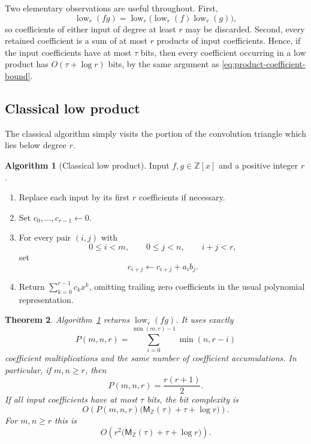 \documentclass[11pt]{book}
\newtheorem{theorem}{Theorem}[section]
\theoremstyle{definition}
\newtheorem{algorithm}[theorem]{Algorithm}
\newcommand{\ZZ}{\mathbb Z}
\newcommand{\MZ}{\mathsf M_{\ZZ}}
\begin{document}
Two elementary observations are useful throughout.  First,
\begin{equation}\label{eq:low-truncate-inputs}
 \operatorname{low}_r(fg)
 =\operatorname{low}_r\bigl(\operatorname{low}_r(f)
                            \operatorname{low}_r(g)\bigr),
\end{equation}
so coefficients of either input of degree at least $r$ may be discarded.
Second, every retained coefficient is a sum of at most $r$ products of input
coefficients.  Hence, if the input coefficients have at most $\tau$ bits,
then every coefficient occurring in a low product has
$O(\tau+\log r)$ bits, by the same argument as
\eqref{eq:product-coefficient-bound}.

\subsection{Classical low product}

The classical algorithm simply visits the portion of the convolution triangle
which lies below degree $r$.

\begin{algorithm}[Classical low product]\label{alg:classical-low-product}
Input $f,g\in\ZZ[x]$ and a positive integer $r$.
\begin{enumerate}
 \item Replace each input by its first $r$ coefficients if necessary.
 \item Set $c_0,\ldots,c_{r-1}\leftarrow0$.
 \item For every pair $(i,j)$ with
 \[
    0\leq i<m,\qquad 0\leq j<n,\qquad i+j<r,
 \]
 set
 \[
    c_{i+j}\leftarrow c_{i+j}+a_ib_j.
 \]
 \item Return $\sum_{k=0}^{r-1}c_kx^k$, omitting trailing zero
 coefficients in the usual polynomial representation.
\end{enumerate}
\end{algorithm}

\begin{theorem}\label{thm:classical-low-product}
Algorithm~\ref{alg:classical-low-product} returns
$\operatorname{low}_r(fg)$.  It uses exactly
\begin{equation}\label{eq:classical-low-count}
 P(m,n,r)=
 \sum_{i=0}^{\min(m,r)-1}\min(n,r-i)
\end{equation}
coefficient multiplications and the same number of coefficient
accumulations.  In particular, if $m,n\geq r$, then
\[
 P(m,n,r)=\frac{r(r+1)}2.
\]
If all input coefficients have at most $\tau$ bits, the bit complexity is
\[
 O\!\left(
 P(m,n,r)\bigl(\MZ(\tau)+\tau+\log r\bigr)
 \right).
\]
For $m,n\geq r$ this is
\[
 O\!\left(r^2\bigl(\MZ(\tau)+\tau+\log r\bigr)\right).
\]
\end{theorem}
\end{document}
